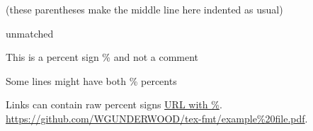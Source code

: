 \documentclass{article}
\begin{document}
(these parentheses
  make the middle line here
indented as usual)


unmatched %

This is a percent sign \% and not a comment

Some lines might have both \% percents %

Links can contain raw percent signs
\href{https://github.com/WGUNDERWOOD/tex-fmt/example%20file.pdf}{URL with \%}.
\url{https://github.com/WGUNDERWOOD/tex-fmt/example%20file.pdf}.
\end{document}
